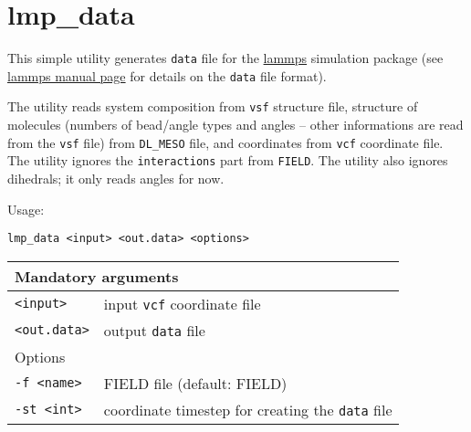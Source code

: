 \section{lmp\_data} \label{sec:lmp_data}

This simple utility generates \texttt{data} file for the
\href{https://lammps.sandia.gov/}{lammps} simulation package (see
\href{https://lammps.sandia.gov/doc/read_data.html}{lammps manual page} for
details on the \texttt{data} file format).

The utility reads system composition from \texttt{vsf} structure file,
structure of molecules (numbers of bead/angle types and angles -- other
informations are read from the \texttt{vsf} file) from \texttt{DL\_MESO}
file, and coordinates from \texttt{vcf} coordinate file.  The utility
ignores the \texttt{interactions} part from \texttt{FIELD}. The utility
also ignores dihedrals; it only reads angles for now.

Usage:

\vspace{1em}
\noindent
\texttt{lmp\_data <input> <out.data> <options>}

\noindent
\begin{longtable}{p{}p{}}
  \toprule
  \multicolumn{2}{l}{Mandatory arguments} \\
  \midrule
  \texttt{<input>} & input \texttt{vcf} coordinate file \\
  \texttt{<out.data>} & output \texttt{data} file \\
  \toprule
  \multicolumn{2}{l}{Options} \\
  \midrule
  \texttt{-f <name>} & FIELD file (default: FIELD)\\
  \texttt{-st <int>} & coordinate timestep for creating the \texttt{data}
  file \\
  \bottomrule
\end{longtable}
